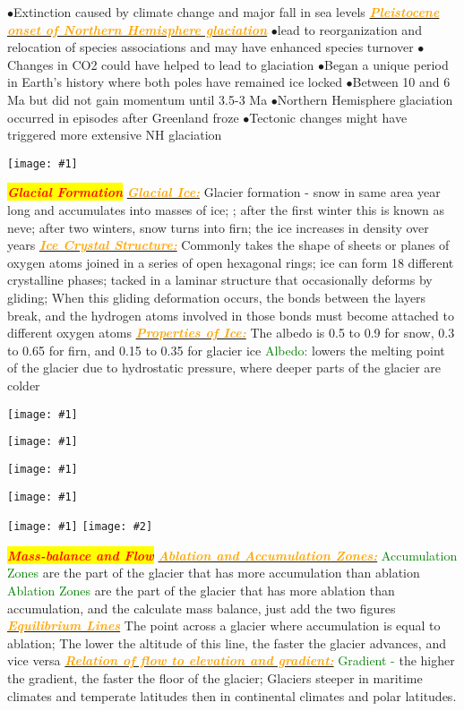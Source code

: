 \documentclass{article}
\newcommand{\ddd}{$\bullet$}
\newcommand{\red}[1]{\textcolor{red}{#1}}
\newcommand{\green}[1]{\textcolor{green}{#1}}
\newcommand{\orange}[1]{\textcolor{orange}{#1}}
\newcommand{\mysection}[1]{\colorbox{yellow}{\textbf{\textit{\red{#1}}}}}
\newcommand{\mysub}[1]{\underline{\textbf{{\textit{\orange{#1}}}}}}
\newcommand{\mysubsub}[1]{{{\green{#1}}}}
\newcommand{\fig}[1]{
	\texttt{[image: \#1]}
}
\newcommand{\figtwo}[2]{
	\texttt{[image: \#1]}
	\texttt{[image: \#2]}
}
\begin{document}
\begin{multicols*}{4}
            \ddd Extinction caused by climate change and major fall in sea levels
        \mysub{Pleistocene onset of Northern Hemisphere glaciation}
            \ddd lead to reorganization and relocation of species associations and may have enhanced species turnover
            \ddd Changes in CO2 could have helped to lead to glaciation
            \ddd Began a unique period in Earth’s history where both poles have remained ice locked
            \ddd Between 10 and 6 Ma but did not gain momentum until 3.5-3 Ma
            \ddd Northern Hemisphere glaciation occurred in episodes after Greenland froze
            \ddd Tectonic changes might have triggered more extensive NH glaciation
        \fig{ice_ages1}
		\mysection{Glacial Formation} %
		\mysub {Glacial Ice:}
		Glacier formation - snow in same area year long and accumulates into masses of ice; ; after the first winter this is known as neve; after two winters, snow turns into firn; the ice increases in density over years
		\mysub{Ice Crystal Structure:} 
		Commonly takes the shape of sheets or planes of oxygen atoms joined in a series of open hexagonal rings; ice can form 18 different crystalline phases; tacked in a laminar structure that occasionally deforms by gliding; When this gliding deformation occurs, the bonds between the layers break, and the hydrogen atoms involved in those bonds must become attached to different oxygen atoms
		\mysub{Properties of Ice:} The albedo is 0.5 to 0.9 for snow, 0.3 to 0.65 for firn, and 0.15 to 0.35 for glacier ice
		\mysubsub{Albedo:} lowers the melting point of the glacier due to hydrostatic pressure, where deeper parts of the glacier are colder
	    \fig{hydrology}
	    \fig{landforms}
        \fig{moraines}
        \fig{Glacier_Types}
        \figtwo{glacierflow2}{Larsen_contours}
		\mysection{Mass-balance and Flow}
		\mysub{Ablation and Accumulation Zones:}
		\mysubsub{Accumulation Zones} are the part of the glacier that has more accumulation than ablation
		\mysubsub{Ablation Zones} are the part of the glacier that has more ablation than accumulation, and the calculate mass balance, just add the two figures
		\mysub{Equilibrium Lines} The point across a glacier where accumulation is equal to ablation; The lower the altitude of this line, the faster the glacier advances, and vice versa
		\mysub{Relation of flow to elevation and gradient:}
		\mysubsub{Gradient -} the higher the gradient, the faster the floor of the glacier; Glaciers steeper in maritime climates and temperate latitudes then in continental climates and polar latitudes.

\end{multicols*}
\end{document}
